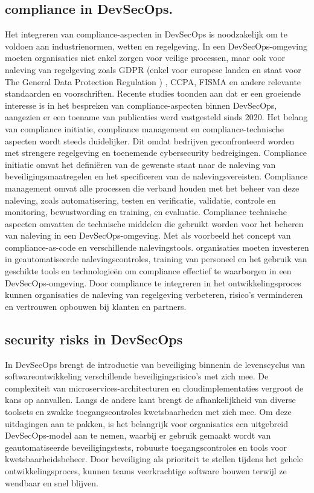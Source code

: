 \documentclass{hogent-article}
\begin{document}
    \subsection{compliance in DevSecOps.}
    Het integreren van compliance-aspecten in DevSecOps is noodzakelijk om te voldoen aan industrienormen, wetten en regelgeving. In een DevSecOps-omgeving moeten organisaties niet enkel zorgen voor veilige processen, maar ook voor naleving van regelgeving zoals GDPR (enkel voor europese landen en staat voor The General Data Protection Regulation ) \cite{Zeeshan2020}, CCPA, FISMA en andere relevante standaarden en voorschriften.
    Recente studies toonden aan dat er een groeiende interesse is in het bespreken van compliance-aspecten binnen DevSecOps, aangezien er een toename van publicaties werd vastgesteld sinds 2020. \cite{Ramaj2022} Het belang van compliance initiatie, compliance management en compliance-technische aspecten wordt steeds duidelijker. Dit omdat bedrijven geconfronteerd worden met strengere regelgeving en toenemende cybersecurity bedreigingen.
    Compliance initiatie omvat het definiëren van de gewenste staat naar de naleving van beveiligingsmaatregelen en het specificeren van de nalevingsvereisten. Compliance management omvat alle processen die verband houden met het beheer van deze naleving, zoals automatisering, testen en verificatie, validatie, controle en monitoring, bewustwording en training, en evaluatie. Compliance technische aspecten omvatten de technische middelen die gebruikt worden voor het beheren van naleving in een DevSecOps-omgeving. Met als voorbeeld het concept van compliance-as-code en verschillende nalevingstools.
    organisaties moeten investeren in geautomatiseerde nalevingscontroles, training van personeel en het gebruik van geschikte tools en technologieën om compliance effectief te waarborgen in een DevSecOps-omgeving.
    Door compliance te integreren in het ontwikkelingsproces kunnen organisaties de naleving van regelgeving verbeteren, risico's verminderen en vertrouwen opbouwen bij klanten en partners.
    \subsection{security risks in DevSecOps}
    In DevSecOps brengt de introductie van beveiliging binnenin de levenscyclus van softwareontwikkeling verschillende beveiligingsrisico's met zich mee. De complexiteit van microservices-architecturen en cloudimplementaties vergroot de kans op aanvallen. Langs de andere kant brengt de afhankelijkheid van diverse toolsets en zwakke toegangscontroles kwetsbaarheden met zich mee. Om deze uitdagingen aan te pakken, is het belangrijk voor organisaties een uitgebreid DevSecOps-model aan te nemen, waarbij er gebruik gemaakt wordt van geautomatiseerde beveiligingstests, robuuste toegangscontroles en tools voor kwetsbaarheidsbeheer. Door beveiliging als prioriteit te stellen tijdens het gehele ontwikkelingsproces, kunnen teams veerkrachtige software bouwen terwijl ze wendbaar en snel blijven. \cite{hackerone}
\end{document}
